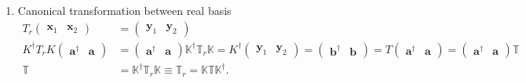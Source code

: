 \documentclass[aps, preprint]{revtex4}
\begin{document}
\begin{enumerate}
\item Canonical transformation between real basis
\begin{align*}T_{r} \left (\begin{array}{cc}\mathbf{x}_{1} & \mathbf{x}_{2}\end{array}\right ) &  =\left (\begin{array}{cc}\mathbf{y}_{1} & \mathbf{y}_{2}\end{array}\right ) \\
K^{ \dag } T_{r} K \left (\begin{array}{cc}\mathbf{a}^{ \dag } & \mathbf{a}\end{array}\right ) &  =\left (\begin{array}{cc}\mathbf{a}^{ \dag } & \mathbf{a}\end{array}\right ) \mathbb{K}^{ \dag } \mathbb{T}_{r} \mathbb{K} =K^{ \dag } \left (\begin{array}{cc}\mathbf{y}_{1} & \mathbf{y}_{2}\end{array}\right ) =\left (\begin{array}{cc}\mathbf{b}^{ \dag } & \mathbf{b}\end{array}\right ) =T \left (\begin{array}{cc}\mathbf{a}^{ \dag } & \mathbf{a}\end{array}\right ) =\left (\begin{array}{cc}\mathbf{a}^{ \dag } & \mathbf{a}\end{array}\right ) \mathbb{T} \\
\mathbb{T} &  =\mathbb{K} ^{ \dag } \mathbb{T}_{r} \mathbb{K} \equiv \mathbb{T}_{r} =\mathbb{K} \mathbb{T} \mathbb{K}^{ \dag }\text{.}\end{align*}


\end{enumerate}
\end{document}
